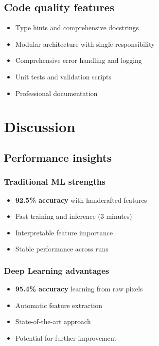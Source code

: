 \documentclass[11pt]{article}
\begin{document}
\subsection{Code quality features}
\begin{itemize}
    \item Type hints and comprehensive docstrings
    \item Modular architecture with single responsibility
    \item Comprehensive error handling and logging
    \item Unit tests and validation scripts
    \item Professional documentation
\end{itemize}

\section{Discussion}

\subsection{Performance insights}

\subsubsection{Traditional ML strengths}
\begin{itemize}
    \item \textbf{92.5\% accuracy} with handcrafted features
    \item Fast training and inference (3 minutes)
    \item Interpretable feature importance
    \item Stable performance across runs
\end{itemize}

\subsubsection{Deep Learning advantages}
\begin{itemize}
    \item \textbf{95.4\% accuracy} learning from raw pixels
    \item Automatic feature extraction
    \item State-of-the-art approach
    \item Potential for further improvement
\end{itemize}
\end{document}
